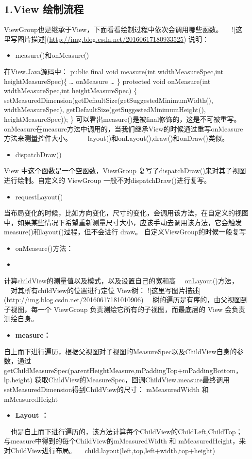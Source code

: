 \documentclass[9pt, b5paper]{article}
\begin{document}
\subsection{1.View 绘制流程}
\label{sec-11-1}
ViewGroup也是继承于View，下面看看绘制过程中依次会调用哪些函数。
 　![这里写图片描述](\url{http://img.blog.csdn.net/20160617180933525})
说明：
\begin{itemize}
\item measure()和onMeasure()
\end{itemize}
在View.Java源码中：
public final void measure(int widthMeasureSpec,int heightMeasureSpec)\{
\ldots{} 
onMeasure
\ldots{}
\}
protected void onMeasure(int widthMeasureSpec,int heightMeasureSpec) \{
        setMeasuredDimension(getDefaultSize(getSuggestedMinimumWidth(), widthMeasureSpec),
        getDefaultSize(getSuggestedMinimumHeight(), heightMeasureSpec));
\}
可以看出measure()是被final修饰的，这是不可被重写。onMeasure在measure方法中调用的，当我们继承View的时候通过重写onMeasure方法来测量控件大小。
 　　layout()和onLayout(),draw()和onDraw()类似。
\begin{itemize}
\item dispatchDraw()
\end{itemize}
View 中这个函数是一个空函数，ViewGroup 复写了dispatchDraw()来对其子视图进行绘制。自定义的 ViewGroup 一般不对dispatchDraw()进行复写。
\begin{itemize}
\item requestLayout()
\end{itemize}
当布局变化的时候，比如方向变化，尺寸的变化，会调用该方法，在自定义的视图中，如果某些情况下希望重新测量尺寸大小，应该手动去调用该方法，它会触发measure()和layout()过程，但不会进行 draw。
自定义ViewGroup的时候一般复写
\begin{itemize}
\item onMeasure()方法：
\item 
\end{itemize}
计算childView的测量值以及模式，以及设置自己的宽和高　
onLayout()方法，
　对其所有childView的位置进行定位
View树：
![这里写图片描述](\url{http://img.blog.csdn.net/20160617181010906})
　树的遍历是有序的，由父视图到子视图，每一个 ViewGroup 负责测绘它所有的子视图，而最底层的 View 会负责测绘自身。
\begin{itemize}
\item \textbf{\textbf{measure：}}
\end{itemize}
自上而下进行遍历，根据父视图对子视图的MeasureSpec以及ChildView自身的参数，通过　　
getChildMeasureSpec(parentHeightMeasure,mPaddingTop+mPaddingBottom，lp.height)
获取ChildView的MeasureSpec，回调ChildView.measure最终调用setMeasuredDimension得到ChildView的尺寸：
mMeasuredWidth 和 mMeasuredHeight
\begin{itemize}
\item \textbf{\textbf{Layout ：}}
\end{itemize}
　也是自上而下进行遍历的，该方法计算每个ChildView的ChildLeft,ChildTop；与measure中得到的每个ChildView的mMeasuredWidth 和 mMeasuredHeight，来对ChildView进行布局。
　child.layout(left,top,left+width,top+height)
\end{document}
